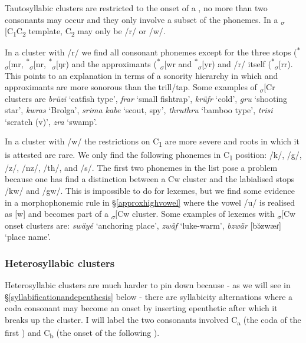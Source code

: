 Tautosyllabic clusters are restricted to the onset of a , no more than two consonants may occur and they only involve a subset of the phonemes. In a \textsubscript{$\sigma$}[C\textsubscript{1}C\textsubscript{2} template, C\textsubscript{2} may only be /r/ or /w/.%

In a cluster with /r/ we find all consonant phonemes except for the three  stops (\textsuperscript{$\ast$}\textsubscript{$\sigma$}[mr, \textsuperscript{$\ast$}\textsubscript{$\sigma$}[nr, \textsuperscript{$\ast$}\textsubscript{$\sigma$}[ŋr) and the approximants (\textsuperscript{$\ast$}\textsubscript{$\sigma$}[wr and \textsuperscript{$\ast$}\textsubscript{$\sigma$}[yr) and /r/ itself (\textsuperscript{$\ast$}\textsubscript{$\sigma$}[rr). This points to an explanation in terms of a sonority hierarchy in which  and approximants are more sonorous than the trill/tap. Some examples of \textsubscript{$\sigma$}[Cr clusters are \emph{brüzi} `catfish type', \emph{frar} `small fishtrap', \emph{krüfr} `cold', \emph{gru} `shooting star', \emph{kwras} `Brolga', \emph{srima kabe} `scout, spy', \emph{thruthru} `bamboo type', \emph{trisi} `scratch (v)', \emph{zra} `swamp'.%

In a cluster with /w/ the restrictions on C\textsubscript{1} are more severe and roots in which it is attested are rare. We only find the following phonemes in C\textsubscript{1} position: /k/, /g/, /z/, /nz/, /th/, and /s/. The first two phonemes in the list pose a problem because one has find a distinction between a Cw cluster and the labialised  stops /kw/ and /gw/. This is impossible to do for lexemes, but we find some evidence in a morphophonemic rule in \S{}\ref{approxhighvowel} where the vowel /u/ is realised as [w] and becomes part of a \textsubscript{$\sigma$}[Cw cluster. Some examples of lexemes with \textsubscript{$\sigma$}[Cw onset clusters are: \emph{swäyé} `anchoring place', \emph{zwäf} `luke-warm', \emph{bzwär} [bə̆zwæɾ] `place name'.

\subsubsection{Heterosyllabic clusters} \label{heterosyllabiccc}

Heterosyllabic clusters are much harder to pin down because - as we will see in \S{}\ref{syllabificationandepenthesis} below - there are syllabicity alternations where a coda consonant may become an onset by inserting epenthetic  after which it breaks up the cluster. I will label the two consonants involved C\textsubscript{a} (the coda of the first ) and C\textsubscript{b} (the onset of the following ).%

